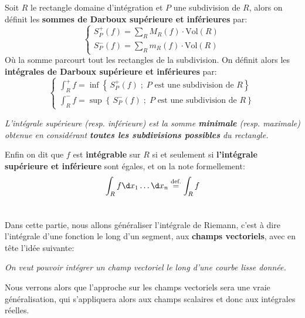 \subsection*{}
Soit \(R\) le rectangle domaine d'intégration et \(P\) une subdivision de \(R\), alors on définit les \textbf{sommes de Darboux supérieure et inférieures} par:
\[
   \begin{cases}
      S_P^+(f) = \sum_R M_R(f) \cdot \text{Vol}(R)\\
      S_P^-(f) = \sum_R m_R(f) \cdot \text{Vol}(R) 
   \end{cases}
\] 
Où la somme parcourt tout les rectangles de la subdivision. On définit alors les \textbf{intégrales de Darboux supérieure et inférieures} par:
\[
   \begin{cases}
      \displaystyle\int_R^+{f} = \inf\left\{\, S_P^+(f)\; ; \; P \text{ est une subdivision de } R\right\}\\
      \displaystyle\int_R^-{f} = \sup\left\{\, S_P^-(f)\; ; \; P \text{ est une subdivision de } R\right\}
   \end{cases}
\]
\begin{center}
   \textit{
      L'intégrale supérieure (resp. inférieure) est la somme \textbf{minimale} (resp. maximale) obtenue en considérant \textbf{toutes les subdivisions possibles} du rectangle.
   }
\end{center}
Enfin on dit que \(f\) est \textbf{intégrable} sur \(R\) si et seulement si \textbf{l'intégrale supérieure et inférieure} sont égales, et on la note formellement:
\[
   \int_R f \d x_1 \ldots \d x_n \overset{\text{def.}}{=} \int_R f 
\]


\subsection*{}


\chapter*{}

Dans cette partie, nous allons généraliser l'intégrale de Riemann, c'est à dire l'intégrale d'une fonction le long d'un segment, aux \textbf{champs vectoriels}, avec en tête l'idée suivante:
\begin{center}
   \textit{On veut pouvoir intégrer un champ vectoriel le long d'une courbe lisse donnée.}
\end{center}
Nous verrons alors que l'approche sur les champs vectoriels sera une vraie généralisation, qui s'appliquera alors aux champs scalaires et donc aux intégrales réelles.\<

